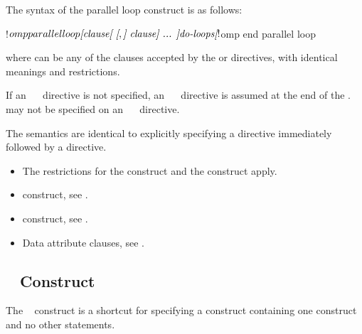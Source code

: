\begin{fortranspecific}
The syntax of the parallel loop construct is as follows:

\begin{ompfPragma}
!$omp parallel loop \plc{[clause[ [},\plc{] clause] ... ]}
   \plc{do-loops}
\plc{[}!$omp end parallel loop\plc{]}
\end{ompfPragma}

where  can be any of the clauses accepted by the  or
   directives, with identical meanings and restrictions.

If an ~~ directive is not specified, an
  ~~ directive is assumed at the end of the
  .  may not be specified on an
  ~~ directive.
\end{fortranspecific}

\descr
The semantics are identical to explicitly specifying a  directive immediately
followed by a  directive. 


\restrictions
\begin{itemize}
\item The restrictions for the  construct and the
   construct apply.
\end{itemize}

\crossreferences
\begin{itemize}
\item {} construct, see
.

\item {} construct, see
.

\item Data attribute clauses, see
.
\end{itemize}




\subsection{~ Construct}
\label{subsec:parallel sections Construct}
\summary
The ~ construct is a shortcut for specifying a 
construct containing one  construct and no other statements.


